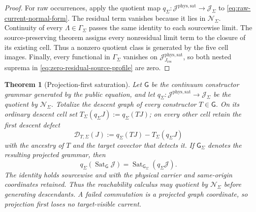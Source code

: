 \documentclass[11pt]{article}
\numberwithin{section}{part}
\theoremstyle{plain}
\newtheorem{theorem}{Theorem}[section]
\theoremstyle{definition}
\theoremstyle{remark}
\newcommand{\Res}{J_{\mathrm{res}}}
\newcommand{\Null}{\mathscr N}
\newcommand{\Phys}{\mathrm{phys}}
\newcommand{\Sat}{\mathrm{sat}}
\begin{document}
\begin{proof}
For raw occurrences, apply the quotient map
\(q_\Sigma:\mathscr J^{\Phys,\Sat}\to\mathscr J_\Sigma\) to
\eqref{eq:raw-current-normal-form}.  The residual term vanishes because it
lies in \(\Null_\Sigma\).  Continuity of every
\(\Lambda\in\Gamma_\Sigma\) passes the same identity to each sourcewise
limit.  The source-preserving theorem assigns every nonresidual limit term to
the closure of its existing cell.  Thus a nonzero quotient class is generated
by the five cell images.  Finally, every functional in \(\Gamma_\Sigma\)
vanishes on \(\mathscr J_{\Res}^{\Phys,\Sat}\), so both nested suprema in
\eqref{eq:zero-residual-source-profile} are zero.
\end{proof}

\begin{theorem}[Projection-first saturation]
\label{thm:projection-first-saturation}
Let \(\mathsf G\) be the continuum constructor grammar generated by the
public equation, and let
\(q_\Sigma:\mathscr J^{\Phys,\Sat}\to\mathscr J_\Sigma\) be the quotient by
\(\Null_\Sigma\).  Totalize the descent graph of every constructor
\(T\in\mathsf G\).  On its ordinary descent cell set
\(T_\Sigma(q_\Sigma J):=q_\Sigma(TJ)\); on every other cell retain the first
descent defect
\begin{equation}
 \label{eq:target-projection-descent-defect}
 \mathcal D_{T,\Sigma}(J)
 :=q_\Sigma(TJ)-T_\Sigma(q_\Sigma J)
\end{equation}
with the ancestry of \(T\) and the target covector that detects it.  If
\(\mathsf G_\Sigma\) denotes the resulting projected grammar, then
\begin{equation}
 \label{eq:projection-first-saturation}
 q_\Sigma\!\left(\operatorname{Sat}_{\mathsf G}\mathscr J\right)
 =\operatorname{Sat}_{\mathsf G_\Sigma}
   \!\left(q_\Sigma\mathscr J\right).
\end{equation}
The identity holds sourcewise and with the physical carrier and same-origin
coordinates retained.  Thus the reachability calculus may quotient by
\(\Null_\Sigma\) before generating descendants.  A failed commutation is a
projected graph coordinate, so projection first loses no target-visible
current.
\end{theorem}
\end{document}
